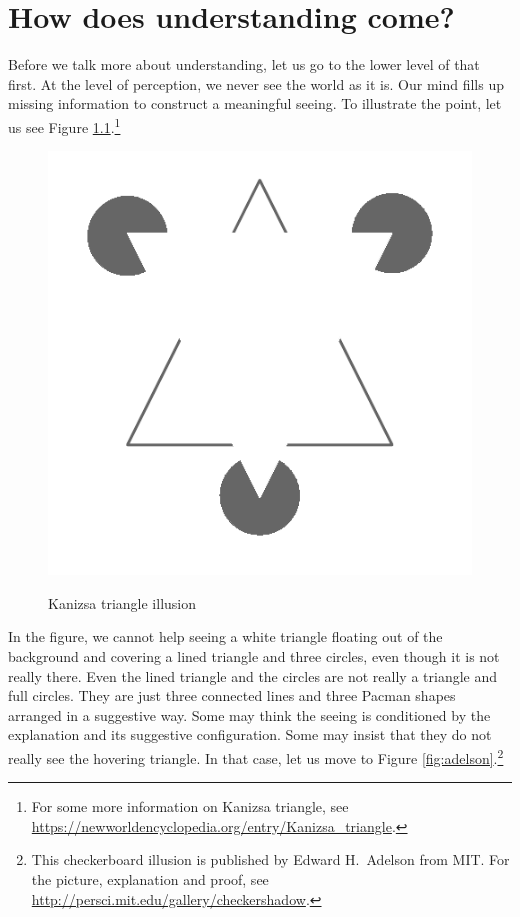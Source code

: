 \chapter{How does understanding come?}\label{chap:howunder}

Before we talk more about understanding, let us go to the lower level of that first. At the level of perception, we never see the world as it is. Our mind fills up missing information to construct a meaningful seeing. To illustrate the point, let us see Figure \ref{fig:kanizsa}.\footnote{For some more information on Kanizsa triangle, see \url{https://newworldencyclopedia.org/entry/Kanizsa_triangle}.}

\begin{figure}[!hbt]
\centering
\includegraphics[width=0.6\linewidth]{images/kanizsa}\\
\caption{Kanizsa triangle illusion}
\label{fig:kanizsa}
\end{figure}

In the figure, we cannot help seeing a white triangle floating out of the background and covering a lined triangle and three circles, even though it is not really there. Even the lined triangle and the circles are not really a triangle and full circles. They are just three connected lines and three Pacman shapes arranged in a suggestive way. Some may think the seeing is conditioned by the explanation and its suggestive configuration. Some may insist that they do not really see the hovering triangle. In that case, let us move to Figure \ref{fig:adelson}.\footnote{This checkerboard illusion is published by Edward H.\ Adelson from MIT. For the picture, explanation and proof, see \url{http://persci.mit.edu/gallery/checkershadow}.}

